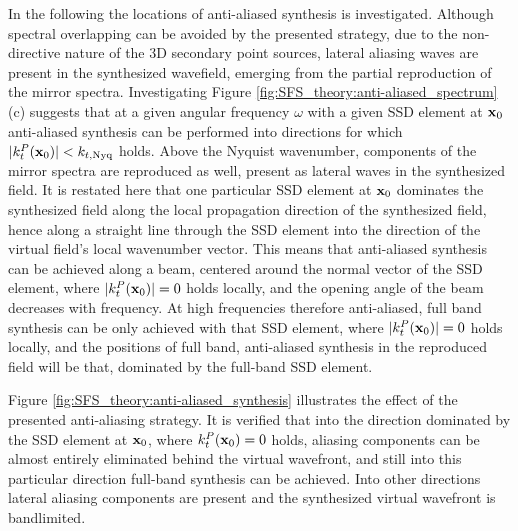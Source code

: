 In the following the locations of anti-aliased synthesis is investigated.
Although spectral overlapping can be avoided by the presented strategy, due to the non-directive nature of the 3D secondary point sources, lateral aliasing waves are present in the synthesized wavefield, emerging from the partial reproduction of the mirror spectra.
Investigating Figure \ref{fig:SFS_theory:anti-aliased_spectrum} (c) suggests that at a given angular frequency $\omega$ with a given SSD element at $\mathbf{x}_0$ anti-aliased synthesis can be performed into directions for which $|k^P_t(\mathbf{x}_0)| < k_{t,\mathrm{Nyq}}$ holds.
Above the Nyquist wavenumber, components of the mirror spectra are reproduced as well, present as lateral waves in the synthesized field. 
It is restated here that one particular SSD element at $\mathbf{x}_0$ dominates the synthesized field along the local propagation direction of the synthesized field, hence along a straight line through the SSD element into the direction of the virtual field's local wavenumber vector.
This means that anti-aliased synthesis can be achieved along a beam, centered around the normal vector of the SSD element, where $|k^P_t(\mathbf{x}_0)| = 0$ holds locally, and the opening angle of the beam decreases with frequency.
At high frequencies therefore anti-aliased, full band synthesis can be only achieved with that SSD element, where $|k^P_t(\mathbf{x}_0)| = 0$ holds locally, and the positions of full band, anti-aliased synthesis in the reproduced field will be that, dominated by the full-band SSD element.

Figure \ref{fig:SFS_theory:anti-aliased_synthesis} illustrates the effect of the presented anti-aliasing strategy.
It is verified that into the direction dominated by the SSD element at $\mathbf{x}_0$, where $k^P_t(\mathbf{x}_0) = 0$ holds, aliasing components can be almost entirely eliminated behind the virtual wavefront, and still into this particular direction full-band synthesis can be achieved.
Into other directions lateral aliasing components are present and the synthesized virtual wavefront is bandlimited.

